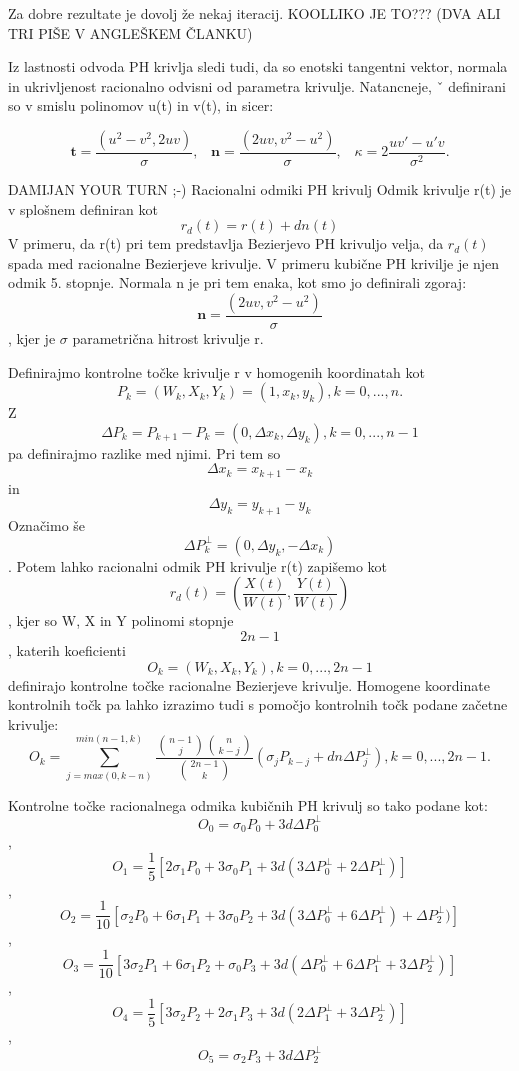 \documentclass[12pt]{article}
\begin{document}
Za dobre rezultate je dovolj že nekaj iteracij. KOOLLIKO JE TO??? (DVA ALI TRI PIŠE V ANGLEŠKEM ČLANKU)

Iz lastnosti odvoda PH krivlja sledi tudi, da so enotski tangentni vektor,
normala in ukrivljenost racionalno odvisni od parametra krivulje. Natancneje, ˇ
definirani so v smislu polinomov u(t) in v(t), in sicer: 

$$\textbf{t} =\frac{(u^2 - v^2, 2uv)}{\sigma},\hspace{10pt} \textbf{n} =\frac{(2uv, v^2 - u^2)}{\sigma},\hspace{10pt} \kappa = 2 \frac{uv\prime - u\prime v}{\sigma^2}.$$


DAMIJAN YOUR TURN ;-)
Racionalni odmiki PH krivulj
Odmik krivulje r(t) je v splošnem definiran kot
$$ r_d(t) = r(t) + dn(t)$$
V primeru, da r(t) pri tem predstavlja Bezierjevo PH krivuljo velja, 
da $r_d(t)$ spada med racionalne Bezierjeve krivulje. V primeru kubične PH krivilje 
je njen odmik 5. stopnje. Normala n je pri tem enaka, kot smo jo definirali zgoraj:
$$\textbf{n} =\frac{(2uv, v^2 - u^2)}{\sigma}$$,
kjer je $\sigma$ parametrična hitrost krivulje r.

Definirajmo kontrolne točke krivulje r v homogenih koordinatah kot
$$ P_k = (W_k, X_k, Y_k) = (1, x_k, y_k), k = 0, ..., n.$$
Z $$\Delta P_k = P_{k+1}-P_k = (0, \Delta x_k, \Delta y_k), k = 0, ..., n-1$$ 
pa definirajmo razlike med njimi. Pri tem so $$\Delta x_k = x_{k+1} - x_k$$ in $$\Delta y_k = y_{k+1} - y_k$$
Označimo še $$ \Delta P_k^{\perp} = (0, \Delta y_k, - \Delta x_k)$$. Potem lahko
racionalni odmik PH krivulje r(t) zapišemo kot
$$ r_d(t) = (\frac{X(t)}{W(t)}, \frac{Y(t)}{W(t)})$$,
kjer so W, X in Y polinomi stopnje $$2n -1$$, katerih koeficienti 
$$ O_k = (W_k, X_k, Y_k), k = 0, ..., 2n-1$$
definirajo kontrolne točke racionalne Bezierjeve krivulje. 
Homogene koordinate kontrolnih točk pa lahko izrazimo tudi s pomočjo kontrolnih točk podane začetne krivulje:
$$ O_k = \sum_{j=max(0,k-n)}^{min(n-1,k)}{\frac{\binom{n-1}{j}\binom{n}{k-j}}{\binom{2n-1}{k}}(\sigma_j P_{k-j}+d n \Delta P^{\perp}_{j})}, k = 0, ..., 2n-1.$$

Kontrolne točke racionalnega odmika kubičnih PH krivulj so tako podane kot:
$$ O_0 = \sigma_0 P_0 + 3 d \Delta P_0^{\perp}$$,
$$ O_1 = \frac{1}{5} [2 \sigma_1 P_0 + 3\sigma_0 P_1 + 3 d (3 \Delta P_0^{\perp} + 2 \Delta P_1^{\perp})]$$,
$$ O_2 = \frac{1}{10} [\sigma_2 P_0 + 6\sigma_1 P_1 + 3\sigma_0 P_2 + 3 d (3 \Delta P_0^{\perp} + 6 \Delta P_1^{\perp}) + \Delta P_2^{\perp})]$$,
$$ O_3 = \frac{1}{10} [3\sigma_2 P_1 + 6\sigma_1 P_2 + \sigma_0 P_3 + 3 d (\Delta P_0^{\perp} + 6 \Delta P_1^{\perp} + 3 \Delta P_2^{\perp})]$$,
$$ O_4 = \frac{1}{5} [3\sigma_2 P_2 + 2\sigma_1 P_3 + 3 d (2\Delta P_1^{\perp} + 3 \Delta P_2^{\perp})]$$,
$$ O_5 = \sigma_2 P_3 + 3 d \Delta P_2^{\perp}$$
\end{document}
